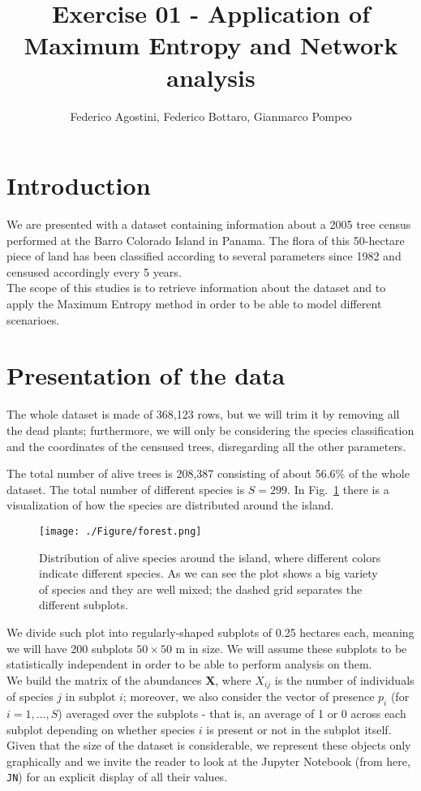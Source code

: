 \documentclass[a4paper,11pt]{article}
\title{Exercise 01 - Application of Maximum Entropy and Network analysis}
\author{Federico Agostini, Federico Bottaro, Gianmarco Pompeo}
\date{}
\begin{document}
\maketitle


\section{Introduction}
We are presented with a dataset containing information about a 2005 tree census performed at the Barro Colorado Island in Panama. The flora of this 50-hectare piece of land has been classified according to several parameters since 1982 and censused accordingly every 5 years.
\\
The scope of this studies is to retrieve information about the dataset and to apply the Maximum Entropy method in order to be able to model different scenarioes.


\section{Presentation of the data}

The whole dataset is made of 368,123 rows, but we will trim it by removing all the dead plants; furthermore, we will only be considering the species classification and the coordinates of the censused trees, disregarding all the other parameters. 

The total number of alive trees is 208,387 consisting of about 56.6\% of the whole dataset. The total number of different species is $S=299$.
In Fig.~\ref{fig:forest} there is a visualization of how the species are distributed around the island.

\begin{figure}[htp]
    \centering
    \texttt{[image: ./Figure/forest.png]}
    \caption{Distribution of alive species around the island, where different colors indicate different species. As we can see the plot shows a big variety of species and they are well mixed; the dashed grid separates the different subplots.}
    \label{fig:forest}
\end{figure}

We divide such plot into regularly-shaped subplots of 0.25 hectares each, meaning we will have 200 subplots $50 \times 50$ m  in size. We will assume these subplots to be statistically independent in order to be able to perform analysis on them.
\\
We build the matrix of the abundances \textbf{X}, where $X_{ij}$ is the number of individuals of species $j$ in subplot $i$; moreover, we also consider the vector of presence $p_i$ (for $i=1,\dots,S$) averaged over the subplots - that is, an average of 1 or 0 across each subplot depending on whether species $i$ is present or not in the subplot itself.
\\
Given that the size of the dataset is considerable, we represent these objects only graphically and we invite the reader to look at the Jupyter Notebook (from here, \texttt{JN}) for an explicit display of all their values.
\end{document}
